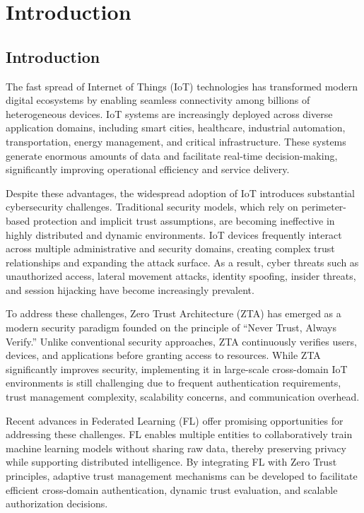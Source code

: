 \chapter{Introduction}

\section{Introduction}

The fast spread of Internet of Things (IoT) technologies has transformed modern digital ecosystems by enabling seamless connectivity among billions of heterogeneous devices. IoT systems are increasingly deployed across diverse application domains, including smart cities, healthcare, industrial automation, transportation, energy management, and critical infrastructure. These systems generate enormous amounts of data and facilitate real-time decision-making, significantly improving operational efficiency and service delivery.


Despite these advantages, the widespread adoption of IoT introduces substantial cybersecurity challenges. Traditional security models, which rely on perimeter-based protection and implicit trust assumptions, are becoming ineffective in highly distributed and dynamic environments. IoT devices frequently interact across multiple administrative and security domains, creating complex trust relationships and expanding the attack surface. As a result, cyber threats such as unauthorized access, lateral movement attacks, identity spoofing, insider threats, and session hijacking have become increasingly prevalent.


To address these challenges, Zero Trust Architecture (ZTA) has emerged as a modern security paradigm founded on the principle of “Never Trust, Always Verify.” Unlike conventional security approaches, ZTA continuously verifies users, devices, and applications before granting access to resources. While ZTA significantly improves security, implementing it in large-scale cross-domain IoT environments is still challenging due to frequent authentication requirements, trust management complexity, scalability concerns, and communication overhead.


Recent advances in Federated Learning (FL) offer promising opportunities for addressing these challenges. FL enables multiple entities to collaboratively train machine learning models without sharing raw data, thereby preserving privacy while supporting distributed intelligence. By integrating FL with Zero Trust principles, adaptive trust management mechanisms can be developed to facilitate efficient cross-domain authentication, dynamic trust evaluation, and scalable authorization decisions.


